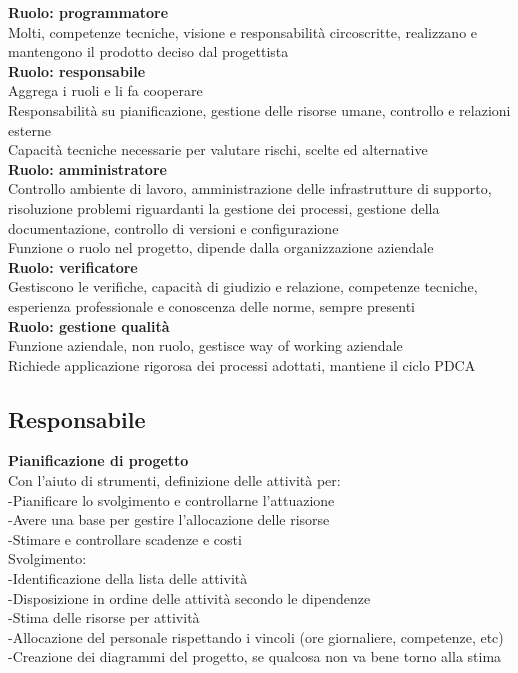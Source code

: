 \documentclass{article}
\begin{document}
		\textbf{Ruolo: programmatore}\\
		Molti, competenze tecniche, visione e responsabilità circoscritte, realizzano e mantengono il prodotto deciso dal progettista\\
		
		\textbf{Ruolo: responsabile}\\
		Aggrega i ruoli e li fa cooperare\\
		Responsabilità su pianificazione, gestione delle risorse umane, controllo e relazioni esterne\\
		Capacità tecniche necessarie per valutare rischi, scelte ed alternative\\
		
		\textbf{Ruolo: amministratore}\\
		Controllo ambiente di lavoro, amministrazione delle infrastrutture di supporto, risoluzione problemi riguardanti la gestione dei processi, gestione della documentazione, controllo di versioni e configurazione\\
		Funzione o ruolo nel progetto, dipende dalla organizzazione aziendale\\
		
		\textbf{Ruolo: verificatore}\\
		Gestiscono le verifiche, capacità di giudizio e relazione, competenze tecniche, esperienza professionale e conoscenza delle norme, sempre presenti\\
		
		\textbf{Ruolo: gestione qualità}\\
		Funzione aziendale, non ruolo, gestisce way of working aziendale\\
		Richiede applicazione rigorosa dei processi adottati, mantiene il ciclo PDCA\\
		
		\subsection{Responsabile}
		\textbf{Pianificazione di progetto}\\
			Con l'aiuto di strumenti, definizione delle attività per:\\
			-Pianificare lo svolgimento e controllarne l'attuazione\\
			-Avere una base per gestire l'allocazione delle risorse\\
			-Stimare e controllare scadenze e costi\\
			
			Svolgimento:\\
			-Identificazione della lista delle attività\\
			-Disposizione in ordine delle attività secondo le dipendenze\\
			-Stima delle risorse per attività\\
			-Allocazione del personale rispettando i vincoli (ore giornaliere, competenze, etc)\\
			-Creazione dei diagrammi del progetto, se qualcosa non va bene torno alla stima\\
			
\end{document}
